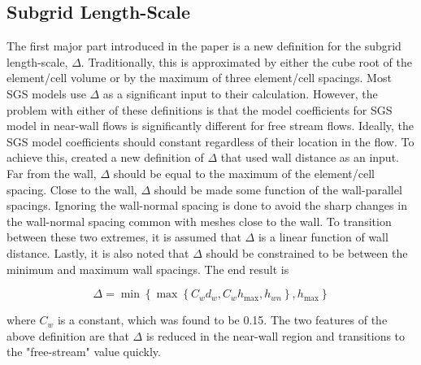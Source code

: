 \documentclass{ucb}
\begin{document}
\subsection{Subgrid Length-Scale}
The first major part introduced in the paper is a new definition for the subgrid length-scale, \(\Delta \). Traditionally, this is approximated by either the cube root of the element/cell volume or by the maximum of three element/cell spacings. Most SGS models use \(\Delta \) as a significant input to their calculation. However, the problem with either of these definitions is that the model coefficients for SGS model in near-wall flows is significantly different for free stream flows. Ideally, the SGS model coefficients should constant regardless of their location in the flow. To achieve this, \citeauthor{shurHybridRANSLESApproach2008} created a new definition of \(\Delta \) that used wall distance as an input. Far from the wall, \(\Delta \) should be equal to the maximum of the element/cell spacing. Close to the wall, \(\Delta \) should be made some function of the wall-parallel spacings. Ignoring the wall-normal spacing is done to avoid the sharp changes in the wall-normal spacing common with meshes close to the wall. To transition between these two extremes, it is assumed that \(\Delta \) is a linear function of wall distance. Lastly, it is also noted that \(\Delta \) should be constrained to be between the minimum and maximum wall spacings. The end result is

\begin{equation}\label{eq:delta}
    \Delta = \min \left \{ 
        \max \left \{ C_w d_w, C_w h_{\max}, h_{wn}\right \} 
        , h_{\max} \right \}
\end{equation}

where \(C_w\) is a constant, which was found to be 0.15. 
The two features of the above definition are that \(\Delta \) is reduced in the near-wall region and transitions to the "free-stream" value quickly. 




\ucbbib{}
    
\end{document}

